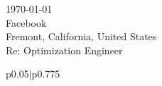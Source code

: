 \documentclass[12pt]{article} %
\begin{document}
\begin{paracol}{2} %


\parbox[top][0.1\textheight][c]{\linewidth}{ %
	\vspace{0.0\textheight} %
	\today\\[6pt]
	Facebook\\
	Fremont, California, United States\\
	Re: Optimization Engineer\\[6pt] \medskip
}


\switchcolumn %


\parbox[top][0.1\textheight][c]{\linewidth}{ %
	\vspace{0\textheight} %
	\colorbox{shade}{ %
		\begin{supertabular}{p{0.05\linewidth}|p{0.775\linewidth}} %
			\ifthenelse{\equal{\cvdate}{}}{}{\raisebox{-1pt}{\faInfo} & \cvdate \\}
			\ifthenelse{\equal{\cvaddress}{}}{}{\raisebox{-1pt}{\faHome} & \cvaddress \\} %
			\ifthenelse{\equal{\cvaddress}{}}{}{\raisebox{-1pt}{\faPhone} & \cvnumberphone \\} %
		\end{supertabular}
	}
}

\end{paracol}
\end{document}

